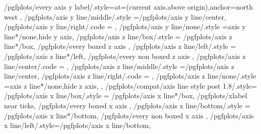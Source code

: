{{{{					/pgfplots/every axis y label/.style={at={(current axis.above origin)},anchor=north west}}%
			\fi
		},
		/pgfplots/axis y line/middle/.style	={/pgfplots/axis y line/center},
		/pgfplots/axis y line/right/.code	={%
			\ifnum{}
			\fi
		},%
		/pgfplots/axis y line/none/.style	={axis y line*/none,hide y axis},
		/pgfplots/axis z line/box/.style	={
			/pgfplots/axis z line*/box,
			/pgfplots/every boxed z axis
		},
		/pgfplots/axis z line/left/.style	={
			/pgfplots/axis z line*/left,
			/pgfplots/every non boxed z axis
		},
		/pgfplots/axis z line/center/.code	={
		},
		/pgfplots/axis z line/middle/.style	={/pgfplots/axis z line/center},
		/pgfplots/axis z line/right/.code	={%
			\ifnum{}
			\fi
		},%
		/pgfplots/axis z line/none/.style	={axis z line*/none,hide z axis},
	},
	/pgfplots/compat/axis line style post 1.8/.style={%
		/pgfplots/axis x line/box/.style	={
			/pgfplots/axis x line*/box,
			/pgfplots/xlabel near ticks,
			/pgfplots/every boxed x axis
		},
		/pgfplots/axis x line/bottom/.style	={
			/pgfplots/axis x line*/bottom,
			/pgfplots/every non boxed x axis
		},
		/pgfplots/axis x line/left/.style={/pgfplots/axis x line/bottom},%
}}
